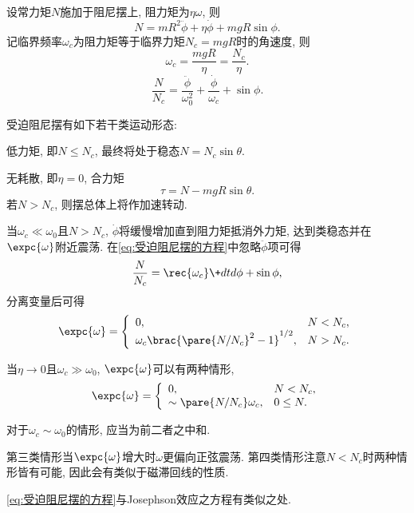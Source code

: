 \documentclass[../TheoreticalMechanics.tex]{subfiles}
\begin{document}
\begin{lemma}[受迫阻尼摆的方程]
    设常力矩$N$施加于阻尼摆上, 阻力矩为$\eta\omega$, 则
    \[ N = mR^2\ddot{\phi} + \eta\dot{\phi} + mgR\sin\phi. \]
    记临界频率$\omega_c$为阻力矩等于临界力矩$N_c = mgR$时的角速度, 则
    \[ \omega_c = \frac{mgR}{\eta} = \frac{N_c}{\eta}. \]
    \begin{equation}
        \label{eq:受迫阻尼摆的方程}
        \frac{N}{N_c} = \frac{\ddot{\phi}}{\omega_0^2} + \frac{\dot{\phi}}{\omega_c} + \sin\phi. 
    \end{equation}
\end{lemma}
\begin{theorem}[受迫阻尼摆的运动形态]
    受迫阻尼摆有如下若干类运动形态:
    \begin{cenum}
        \item 低力矩, 即$N \le N_c$, 最终将处于稳态$N = N_c\sin\theta$.
        \item 无耗散, 即$\eta = 0$, 合力矩
        \[ \tau = N - mgR\sin\theta. \]
        若$N > N_c$, 则摆总体上将作加速转动.
        \item 当$\omega_c \ll \omega_0$且$N>N_c$, $\dot{\phi}$将缓慢增加直到阻力矩抵消外力矩, 达到类稳态并在$\expc{\omega}$附近震荡. 在\eqref{eq:受迫阻尼摆的方程}中忽略$\ddot{\phi}$项可得
        \[ \frac{N}{N_c} = \rec{\omega_c}\+dtd\phi + \sin\phi, \]
        分离变量后可得
        \[ \expc{\omega} = \left\{\begin{array}{ll}
            0, & N<N_c,\\
            \omega_c \brac{\pare{N/N_c}^2 - 1}^{1/2}, & N > N_c.
        \end{array}\right. \]
        \item 当$\eta\rightarrow 0$且$\omega_c\gg \omega_0$, $\expc{\omega}$可以有两种情形,
        \[ \expc{\omega} = \left\{\begin{array}{ll}
            0, & N<N_c,\\
            \sim \pare{N/N_c}\omega_c, & 0 \le N.
        \end{array}\right. \]
        \item 对于$\omega_c\sim\omega_0$的情形, 应当为前二者之中和.
    \end{cenum}
\end{theorem}
\begin{remark}
    第三类情形当$\expc{\omega}$增大时$\omega$更偏向正弦震荡. 第四类情形注意$N < N_c$时两种情形皆有可能, 因此会有类似于磁滞回线的性质.
\end{remark}
\begin{remark}
    \eqref{eq:受迫阻尼摆的方程}与Josephson效应之方程有类似之处.
\end{remark}



\end{document}
